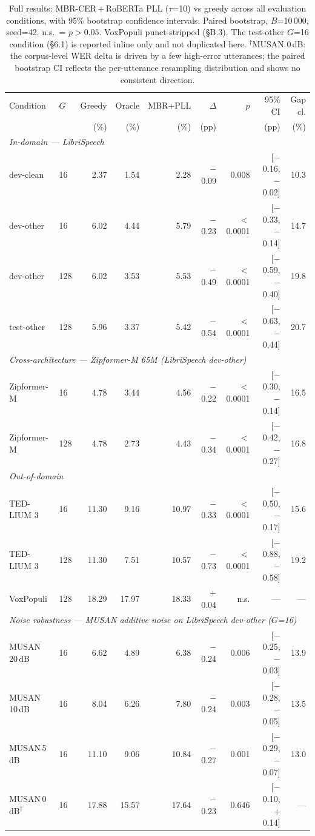 \begin{table}[t]
\centering
\footnotesize
\caption{Full results: MBR-CER\,+\,RoBERTa PLL ($\tau$=10) vs greedy across all evaluation
conditions, with 95\% bootstrap confidence intervals. Paired bootstrap, $B$=10\,000, seed=42.
n.s.\ = $p>0.05$. VoxPopuli punct-stripped (§B.3).
The test-other $G$=16 condition (§6.1) is reported inline only and not duplicated here.
$^{\dagger}$MUSAN 0\,dB: the corpus-level WER delta is driven by a few high-error utterances; the
paired bootstrap CI reflects the per-utterance resampling distribution and shows no consistent direction.}
\label{tab:master-full}
\begin{tabular}{llrrrrrrr}
\hline
Condition & $G$ & Greedy & Oracle & MBR+PLL & $\Delta$ & $p$ & 95\% CI & Gap cl. \\
 & & (\%) & (\%) & (\%) & (pp) & & (pp) & (\%) \\
\hline
\multicolumn{9}{l}{\textit{In-domain — LibriSpeech}} \\
dev-clean    & 16  & 2.37  & 1.54  & 2.28  & $-$0.09 & 0.008    & [$-$0.16,\;$-$0.02] & 10.3 \\
dev-other    & 16  & 6.02  & 4.44  & 5.79  & $-$0.23 & $<$0.0001 & [$-$0.33,\;$-$0.14] & 14.7 \\
dev-other    & 128 & 6.02  & 3.53  & 5.53  & $-$0.49 & $<$0.0001 & [$-$0.59,\;$-$0.40] & 19.8 \\
test-other   & 128 & 5.96  & 3.37  & 5.42  & $-$0.54 & $<$0.0001 & [$-$0.63,\;$-$0.44] & 20.7 \\
\hline
\multicolumn{9}{l}{\textit{Cross-architecture — Zipformer-M 65M (LibriSpeech dev-other)}} \\
Zipformer-M  & 16  & 4.78  & 3.44  & 4.56  & $-$0.22 & $<$0.0001 & [$-$0.30,\;$-$0.14] & 16.5 \\
Zipformer-M  & 128 & 4.78  & 2.73  & 4.43  & $-$0.34 & $<$0.0001 & [$-$0.42,\;$-$0.27] & 16.8 \\
\hline
\multicolumn{9}{l}{\textit{Out-of-domain}} \\
TED-LIUM 3   & 16  & 11.30 & 9.16  & 10.97 & $-$0.33 & $<$0.0001 & [$-$0.50,\;$-$0.17] & 15.6 \\
TED-LIUM 3   & 128 & 11.30 & 7.51  & 10.57 & $-$0.73 & $<$0.0001 & [$-$0.88,\;$-$0.58] & 19.2 \\
VoxPopuli    & 128 & 18.29 & 17.97 & 18.33 & $+$0.04 & n.s.       & ---                  & ---  \\
\hline
\multicolumn{9}{l}{\textit{Noise robustness — MUSAN additive noise on LibriSpeech dev-other ($G$=16)}} \\
MUSAN 20\,dB & 16  & 6.62  & 4.89  & 6.38  & $-$0.24 & 0.006 & [$-$0.25,\;$-$0.03] & 13.9 \\
MUSAN 10\,dB & 16  & 8.04  & 6.26  & 7.80  & $-$0.24 & 0.003 & [$-$0.28,\;$-$0.05] & 13.5 \\
MUSAN\;\,5\,dB  & 16  & 11.10 & 9.06  & 10.84 & $-$0.27 & 0.001 & [$-$0.29,\;$-$0.07] & 13.0 \\
MUSAN\;\,0\,dB$^{\dagger}$  & 16  & 17.88 & 15.57 & 17.64 & $-$0.23 & 0.646 & [$-$0.10,\;$+$0.14] & ---  \\
\hline
\end{tabular}
\end{table}

